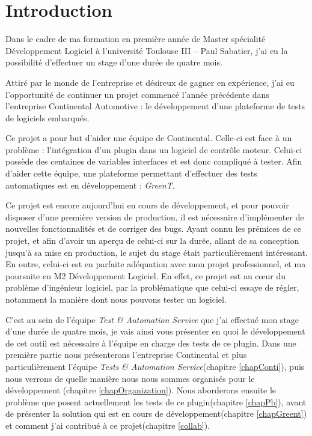 \chapter*{Introduction}
Dans le cadre de ma formation en première année de Master spécialité Développement Logiciel à l'université Toulouse III – Paul Sabatier, j'ai eu la possibilité d'effectuer un stage d'une durée de quatre mois.

Attiré par le monde de l'entreprise et désireux de gagner en expérience, j'ai eu l'opportunité de continuer un projet commencé l'année précédente dans l'entreprise Continental Automotive : le développement d'une plateforme de tests de logiciels embarqués.

Ce projet a pour but d'aider une équipe de Continental. Celle-ci est face à un problème : l'intégration d'un plugin dans un logiciel de contrôle moteur. Celui-ci possède des centaines de variables interfaces et est donc compliqué à tester. Afin d'aider cette équipe, une plateforme permettant d'effectuer des tests automatiques est en développement : \textit{GreenT}.

Ce projet est encore aujourd'hui en cours de développement, et pour pouvoir disposer d'une première version de production, il est nécessaire d'implémenter de nouvelles fonctionnalités et de corriger des bugs. Ayant connu les prémices de ce projet, et afin d'avoir un aperçu de celui-ci sur la durée, allant de sa conception jusqu'à sa mise en production, le sujet du stage était particulièrement intéressant. En outre, celui-ci est en parfaite adéquation avec mon projet professionnel, et ma poursuite en M2 Développement Logiciel. En effet, ce projet est au cœur du problème d'ingénieur logiciel, par la problématique que celui-ci essaye de régler, notamment la manière dont nous pouvons tester un logiciel. 


C'est au sein de l'équipe \textit{Test \& Automation Service} que j'ai effectué mon stage d'une durée de quatre mois, je vais ainsi vous présenter en quoi le développement de cet outil est nécessaire à l'équipe en charge des tests de ce plugin. Dans une première partie nous présenterons l'entreprise Continental et plus particulièrement l'équipe \textit{Tests \& Automation Service}(chapitre \ref{chapConti}), puis nous verrons de quelle manière nous nous sommes organisés pour le développement (chapitre \ref{chapOrganization}). Nous aborderons ensuite le problème que posent actuellement les tests de ce plugin(chapitre \ref{chapPb}), avant de présenter la solution qui est en cours de développement(chapitre \ref{chapGreent}) et comment j'ai contribué à ce projet(chapitre \ref{collab}). 
